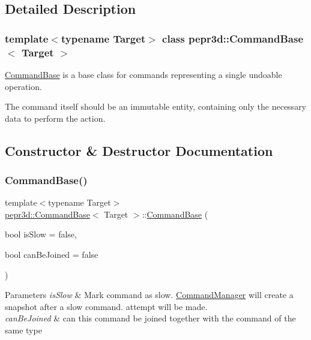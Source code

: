 \subsection{Detailed Description}
\subsubsection*{template$<$typename Target$>$\newline
class pepr3d\+::\+Command\+Base$<$ Target $>$}

\mbox{\hyperlink{classpepr3d_1_1_command_base}{Command\+Base}} is a base class for commands representing a single undoable operation. 

The command itself should be an immutable entity, containing only the necessary data to perform the action. 

\subsection{Constructor \& Destructor Documentation}
\mbox{\label{classpepr3d_1_1_command_base_aa4644cac610c68ac671fbf04af61186f}} 
\subsubsection{\texorpdfstring{CommandBase()}{CommandBase()}}
{\footnotesize\ttfamily template$<$typename Target$>$ \\
\mbox{\hyperlink{classpepr3d_1_1_command_base}{pepr3d\+::\+Command\+Base}}$<$ Target $>$\+::\mbox{\hyperlink{classpepr3d_1_1_command_base}{Command\+Base}} (\begin{DoxyParamCaption}\item[{bool}]{is\+Slow = {\ttfamily false},  }\item[{bool}]{can\+Be\+Joined = {\ttfamily false} }\end{DoxyParamCaption})\hspace{0.3cm}{\ttfamily [inline]}}


\begin{DoxyParams}{Parameters}
{\em is\+Slow} & Mark command as slow. \mbox{\hyperlink{classpepr3d_1_1_command_manager}{Command\+Manager}} will create a snapshot after a slow command. attempt will be made. \\
\hline
{\em can\+Be\+Joined} & can this command be joined together with the command of the same type \\
\hline
\end{DoxyParams}


